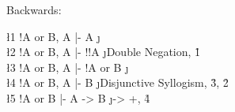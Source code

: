\documentclass[class=cs245,leqno]{agony}
\begin{document}
\begin{theorem}[Implication]
\end{theorem}
\begin{prf}
  Backwards:
  \begin{deduce}
    \l1 !A or B, A |- A       \j {\E} \\
    \l2 !A or B, A |- !!A     \j {Double Negation, \r1}\\
    \l3 !A or B, A |- !A or B \j {\E}\\
    \l4 !A or B, A |- B       \j {Disjunctive Syllogism, \r3, \r2}\\
    \l5 !A or B    |- A -> B  \j {-> +, \r4}
  \end{deduce}
\end{prf}
\end{document}
